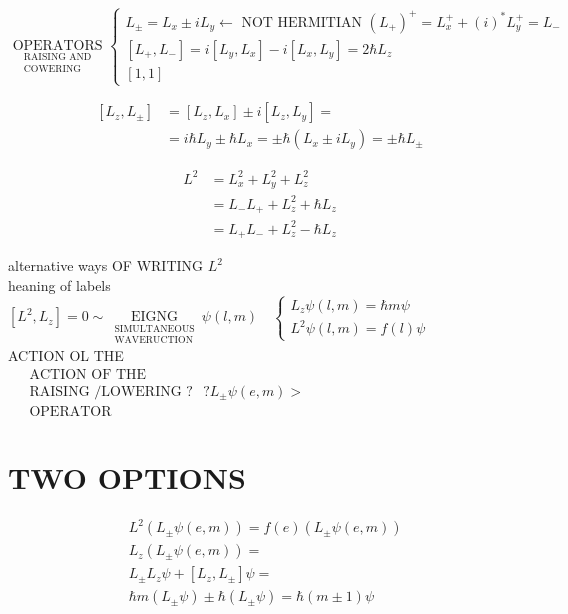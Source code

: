 $\underset{\substack{\text { RAISING AND } \\ \text { COWERING }}}{\text { OPERATORS }}\left\{\begin{array}{l}L_{ \pm}=L_{x} \pm i L_{y} \leftarrow \text { NOT HERMITIAN }\left(L_{+}\right)^{+}=L_{x}^{+}+(i)^{*} L_{y}^{+}=L_{-} \\ {\left[L_{+}, L_{-}\right]=i\left[L_{y}, L_{x}\right]-i\left[L_{x}, L_{y}\right]=2 \hbar L_{z}} \\ {[1,1]}\end{array}\right.$

$$
\begin{aligned}
{\left[L_{z}, L_{ \pm}\right] } & =\left[L_{z}, L_{x}\right] \pm i\left[L_{z}, L_{y}\right]= \\
& =i \hbar L_{y} \pm \hbar L_{x}= \pm \hbar\left(L_{x} \pm i L_{y}\right)= \pm \hbar L_{ \pm}
\end{aligned}
$$

$$
\begin{aligned}
L^{2} & =L_{x}^{2}+L_{y}^{2}+L_{z}^{2} \\
& =L_{-} L_{+}+L_{z}^{2}+\hbar L_{z} \\
& =L_{+} L_{-}+L_{z}^{2}-\hbar L_{z}
\end{aligned}
$$

alternative ways OF WRITING $L^{2}$\\
heaning of labels\\
$\left[L^{2}, L_{z}\right]=0 \sim \underset{\substack{\text { SIMULTANEOUS } \\ \text { WAVERUCTION }}}{\text { EIGNG }} \psi(l, m) \quad\left\{\begin{array}{l}L_{z} \psi(l, m)=\hbar m \psi \\ L^{2} \psi(l, m)=f(l) \psi\end{array}\right.$\\
ACTION OL THE\\
$\begin{aligned} & \text { ACTION OF THE } \\ & \text { RAISING /LOWERING ? } \\ & \text { OPERATOR }\end{aligned} ? L_{ \pm} \psi(e, m)>$

\section*{TWO OPTIONS}
$$
\begin{aligned}
& L^{2}\left(L_{ \pm} \psi(e, m)\right)=f(e)\left(L_{ \pm} \psi(e, m)\right) \\
& L_{z}\left(L_{ \pm} \psi(e, m)\right)= \\
& L_{ \pm} L_{z} \psi+\left[L_{z}, L_{ \pm}\right] \psi= \\
& \hbar m\left(L_{ \pm} \psi\right) \pm \hbar\left(L_{ \pm} \psi\right)=\hbar(m \pm 1) \psi
\end{aligned}
$$

